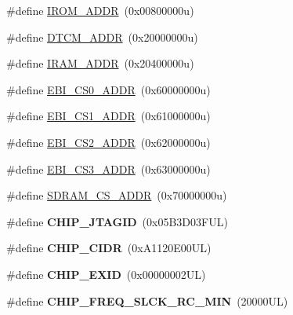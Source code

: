 \begin{DoxyCompactItemize}
\item 
\#define \mbox{\hyperlink{group__SAMS70Q21__definitions_ga694212ffb8c2786bacee3d0ad6020bda}{I\+R\+O\+M\+\_\+\+A\+D\+DR}}~(0x00800000u)
\item 
\#define \mbox{\hyperlink{group__SAMS70Q21__definitions_ga26626a425f7ebb3a0c2dbc276f0d9f78}{D\+T\+C\+M\+\_\+\+A\+D\+DR}}~(0x20000000u)
\item 
\#define \mbox{\hyperlink{group__SAMS70Q21__definitions_gaae45ac2ef16942159481c767ac4805cf}{I\+R\+A\+M\+\_\+\+A\+D\+DR}}~(0x20400000u)
\item 
\#define \mbox{\hyperlink{group__SAMS70Q21__definitions_ga9bcbb97ddae3b2cc5e2c9613d33f66b4}{E\+B\+I\+\_\+\+C\+S0\+\_\+\+A\+D\+DR}}~(0x60000000u)
\item 
\#define \mbox{\hyperlink{group__SAMS70Q21__definitions_gaaddd9fdbbc77c9aced5308819f502a26}{E\+B\+I\+\_\+\+C\+S1\+\_\+\+A\+D\+DR}}~(0x61000000u)
\item 
\#define \mbox{\hyperlink{group__SAMS70Q21__definitions_ga058a35f9991487dc2dd12ada792d0730}{E\+B\+I\+\_\+\+C\+S2\+\_\+\+A\+D\+DR}}~(0x62000000u)
\item 
\#define \mbox{\hyperlink{group__SAMS70Q21__definitions_gad66ebdd0fc33ec3cf85dbaa14bbf05d9}{E\+B\+I\+\_\+\+C\+S3\+\_\+\+A\+D\+DR}}~(0x63000000u)
\item 
\#define \mbox{\hyperlink{group__SAMS70Q21__definitions_ga61b7db25daf759c2a2beb6e5a0b57a84}{S\+D\+R\+A\+M\+\_\+\+C\+S\+\_\+\+A\+D\+DR}}~(0x70000000u)
\item 
\mbox{\label{group__SAMS70Q21__definitions_gaa614519778eec0df55d3eeab3223e3f6}} 
\#define {\bfseries C\+H\+I\+P\+\_\+\+J\+T\+A\+G\+ID}~(0x05\+B3\+D03\+F\+U\+L)
\item 
\mbox{\label{group__SAMS70Q21__definitions_ga1e1ae44dd9269a8a98c1d7e7a60e9fbd}} 
\#define {\bfseries C\+H\+I\+P\+\_\+\+C\+I\+DR}~(0x\+A1120\+E00\+U\+L)
\item 
\mbox{\label{group__SAMS70Q21__definitions_ga35123717aa86b76bb6b73cf3adc4c2e6}} 
\#define {\bfseries C\+H\+I\+P\+\_\+\+E\+X\+ID}~(0x00000002\+U\+L)
\item 
\mbox{\label{group__SAMS70Q21__definitions_ga0e868bf27426399dfdcb3a9dfc3733c4}} 
\#define {\bfseries C\+H\+I\+P\+\_\+\+F\+R\+E\+Q\+\_\+\+S\+L\+C\+K\+\_\+\+R\+C\+\_\+\+M\+IN}~(20000\+U\+L)

\end{DoxyCompactItemize}
